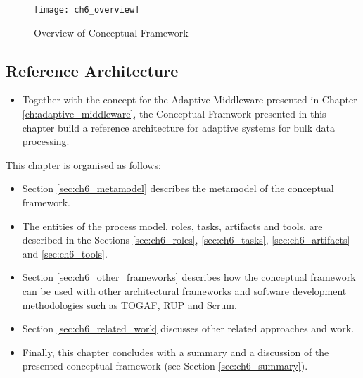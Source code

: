 \begin{figure}
	[htpb] \centering 
	\texttt{[image: ch6\_overview]} \caption{Overview of Conceptual Framework} \label{fig:ch6_overview} 
\end{figure}

\subsection{Reference Architecture}

\begin{itemize}
	\item Together with the concept for the Adaptive Middleware presented in Chapter \ref{ch:adaptive_middleware}, the Conceptual Framwork presented in this chapter build a reference architecture for adaptive systems for bulk data processing.
\end{itemize}

This chapter is organised as follows:

\begin{itemize}
	\item Section \ref{sec:ch6_metamodel} describes the metamodel of the conceptual framework.
	\item The entities of the process model, roles, tasks, artifacts and tools, are described in the Sections \ref{sec:ch6_roles}, \ref{sec:ch6_tasks}, \ref{sec:ch6_artifacts} and \ref{sec:ch6_tools}.
	\item Section \ref{sec:ch6_other_frameworks} describes how the conceptual framework can be used with other architectural frameworks and software development methodologies such as TOGAF, \acf{RUP} and Scrum.
	\item Section \ref{sec:ch6_related_work} discusses other related approaches and work.
	\item Finally, this chapter concludes with a summary and a discussion of the presented conceptual framework (see Section \ref{sec:ch6_summary}).
\end{itemize}

